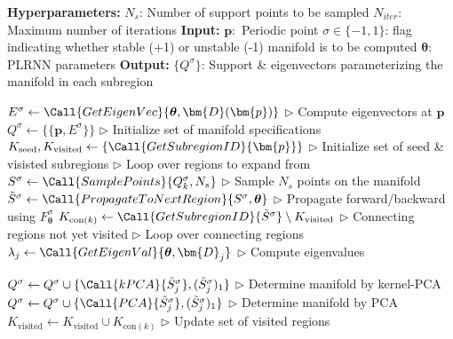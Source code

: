 \documentclass{article}
\theoremstyle{example}
\theoremstyle{plain}
\theoremstyle{definition}
\theoremstyle{remark}
\def\mD{{\bm{D}}}
\begin{document}
\begin{algorithm}[!htbp]
%
\caption{Manifold Construction }
\label{alg:new_manifold}
\textbf{Hyperparameters:} $N_s$: Number of support points to be sampled\newline
 \hspace*{8em} $N_{iter}$: Maximum number of iterations %
 \newline
\textbf{Input:} $\bm{p}:$ Periodic point \newline
            \hspace*{3em} $ \sigma \in \{-1,1\}$: flag indicating whether stable (+1) or unstable (-1) manifold is to be computed \newline
              \hspace*{3em} $ \boldsymbol{\theta} $: PLRNN parameters \newline
   \textbf{Output:} $\{Q^\sigma\}$: Support \& eigenvectors parameterizing the manifold in each subregion
   \begin{algorithmic}[1]
   \State $E^\sigma  \gets \Call{GetEigenVec}{\boldsymbol{\theta}, \mD(\bm{p})}$ \hfill $\triangleright$ Compute eigenvectors at $\bm{p}$
   \State $Q^\sigma \gets \{\{\bm{p}, E^\sigma\}\}$  \hfill $\triangleright$ Initialize set of manifold specifications
    \State $K_\text{seed}, K_\text{visited} \gets \{\Call{GetSubregionID}{\bm{p}}\}$ \hfill $\triangleright$ Initialize set of seed \& visisted subregions
          \hfill $\triangleright$ Loop over regions to expand from
          \State $S^\sigma \gets \Call{SamplePoints}{Q^\sigma_k, {N_s}}$
    \hfill $\triangleright$ Sample $N_s$ points on the  manifold
            \State     $\Tilde{S}^\sigma \gets \Call{PropagateToNextRegion}{S^\sigma,\boldsymbol{\theta}}$
            \hfill $\triangleright$ Propagate forward/backward 
            using $F^\sigma_{\boldsymbol{\theta}}$
              \State $ K_{\text{con}(k)}\gets \Call{GetSubregionID}{\Tilde{S}^\sigma} \setminus K_\text{visited}$ \hfill $\triangleright$ Connecting regions not yet visited
              \hfill $\triangleright$ Loop over connecting regions
                \State $\lambda_{j} \gets \Call{GetEigenVal}{\boldsymbol{\theta},\mD_{j}}$
              \hfill $\triangleright$ Compute eigenvalues

                    \State $Q^\sigma \gets Q^\sigma \cup \{\Call{kPCA}{
                    \Tilde{S}^\sigma_{j}},(\Tilde{S}^\sigma_{j})_1\}$
                    \hfill $\triangleright$ Determine manifold by kernel-PCA
                \Else
                   \State $Q^\sigma \gets Q^\sigma \cup \{\Call{PCA}{\Tilde{S}^\sigma_{j}},(\Tilde{S}^\sigma_{j})_1\}$
                    \hfill $\triangleright$ Determine manifold by PCA
                \EndIf
            \EndFor
            \State $K_\text{visited} \gets K_\text{visited}\cup K_{\text{con}(k)}$ \hfill $\triangleright$ Update set of visited regions


\end{algorithmic}
\end{algorithm}
\end{document}
